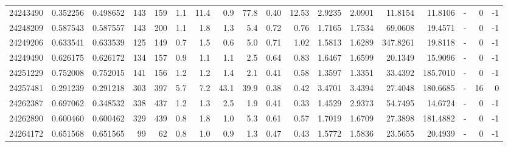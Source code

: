 \begin{tabular}{rrrrrrrrrrrrrrrlrr}
  24243490 & 0.352256 &   0.498652 &  143 &  159 &      1.1 &     11.4 &     0.9 &     77.8 &       0.40 &       12.53 &  2.9235 &  2.0901 &   11.8154 &   11.8106 &             - &        0 &         -1 \\
  24248209 & 0.587543 &   0.587557 &  143 &  200 &      1.1 &      1.8 &     1.3 &      5.4 &       0.72 &        0.76 &  1.7165 &  1.7534 &   69.0608 &   19.4571 &             - &        0 &         -1 \\
  24249206 & 0.633541 &   0.633539 &  125 &  149 &      0.7 &      1.5 &     0.6 &      5.0 &       0.71 &        1.02 &  1.5813 &  1.6289 &  347.8261 &   19.8118 &             - &        0 &         -1 \\
  24249490 & 0.626175 &   0.626172 &  134 &  157 &      0.9 &      1.1 &     1.1 &      2.5 &       0.64 &        0.83 &  1.6467 &  1.6599 &   20.1349 &   15.9096 &             - &        0 &         -1 \\
  24251229 & 0.752008 &   0.752015 &  141 &  156 &      1.2 &      1.2 &     1.4 &      2.1 &       0.41 &        0.58 &  1.3597 &  1.3351 &   33.4392 &  185.7010 &             - &        0 &         -1 \\
  24257481 & 0.291239 &   0.291218 &  303 &  397 &      5.7 &      7.2 &    43.1 &     39.9 &       0.38 &        0.42 &  3.4701 &  3.4394 &   27.4048 &  180.6685 &             - &       16 &          0 \\
  24262387 & 0.697062 &   0.348532 &  338 &  437 &      1.2 &      1.3 &     2.5 &      1.9 &       0.41 &        0.33 &  1.4529 &  2.9373 &   54.7495 &   14.6724 &             - &        0 &         -1 \\
  24262890 & 0.600460 &   0.600462 &  329 &  439 &      0.8 &      1.8 &     1.0 &      5.3 &       0.61 &        0.57 &  1.7019 &  1.6709 &   27.3898 &  181.4882 &             - &        0 &         -1 \\
  24264172 & 0.651568 &   0.651565 &   99 &   62 &      0.8 &      1.0 &     0.9 &      1.3 &       0.47 &        0.43 &  1.5772 &  1.5836 &   23.5655 &   20.4939 &             - &        0 &         -1 \\
\bottomrule
\end{tabular}
